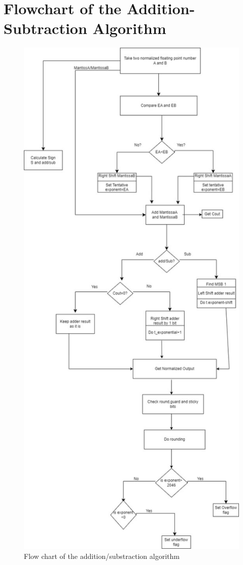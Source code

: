 \documentclass[18pt]{article}
\begin{document}
\section{Flowchart of the Addition-Subtraction Algorithm}
\vspace{5mm}
\begin{figure}[!h]
    \centering
    \captionsetup{font=Large}
    \includegraphics[scale=0.75]{Util/flowchart.jpg}
    \caption{Flow chart of the addition/substraction algorithm}
\end{figure}
\newpage
\end{document}
